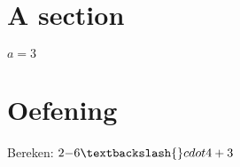 \documentclass{article}%
\begin{document}
%
\normalsize%
\section{A section}%
\label{sec:Asection}%
$a =  3$

%
\section{Oefening}%
Bereken:%
$2  {-}  6 \textbackslash{}cdot  4  +  3$

%
\end{document}
